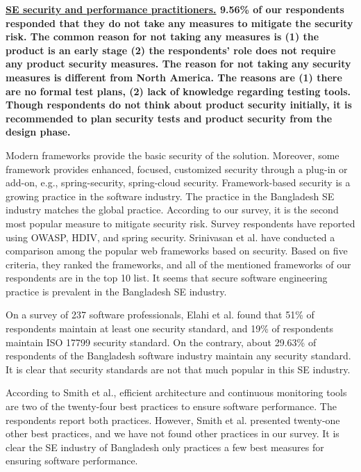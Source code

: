 \bf{\ul{SE security and performance practitioners.}} 9.56\% of our respondents responded that they do not take any measures to mitigate the security risk. The common reason for not taking any measures is (1) the product is an early stage (2) the respondents' role does not require any product security measures. The reason for not taking any security measures is different from North America\citep{Assal2019}. The reasons are (1) there are no formal test plans, (2) lack of knowledge regarding testing tools. Though respondents do not think about product security initially, it is recommended\citep{Chandra2009,Azham2011} to plan security tests and product security from the design phase.

Modern frameworks provide the basic security of the solution. Moreover, some framework provides enhanced, focused, customized security through a plug-in or add-on, e.g., spring-security, spring-cloud security. Framework-based security is a growing practice in the software industry\citep{Alssir2012}. The practice in the Bangladesh SE industry matches the global practice. According to our survey, it is the second most popular measure to mitigate security risk. Survey respondents have reported using OWASP, HDIV, and spring security. Srinivasan et al.\citep{Srinivasan2017} have conducted a comparison among the popular web frameworks based on security. Based on five criteria, they ranked the frameworks, and all of the mentioned frameworks of our respondents are in the top 10 list. It seems that secure software engineering practice is prevalent in the Bangladesh SE industry.


On a survey of 237 software professionals, Elahi et al.\citep{Elahi2011} found that 51\% of respondents maintain at least one security standard, and 19\% of respondents maintain ISO 17799 security standard. On the contrary, about 29.63\% of respondents of the Bangladesh software industry maintain any security standard. It is clear that security standards are not that much popular in this SE industry.

According to Smith et al.\citep{Smith2003}, efficient architecture and continuous monitoring tools are two of the twenty-four best practices to ensure software performance. The respondents report both practices. However, Smith et al. presented twenty-one other best practices, and we have not found other practices in our survey. It is clear the SE industry of Bangladesh only practices a few best measures for ensuring software performance.



